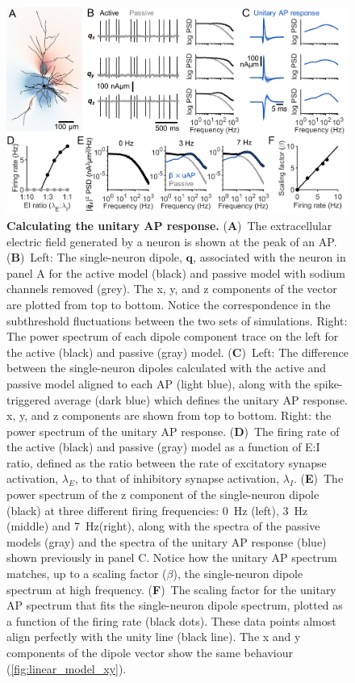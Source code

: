 \begin{figure}[t!]
	\centering
	\includegraphics[width=13.2cm]{Figures/chapter3/figure1.png}
    
    \caption[Calculating the unitary AP response]{\textbf{Calculating the unitary AP response.} (\textbf{A})~The extracellular electric field generated by a neuron is shown at the peak of an AP. (\textbf{B})~Left: The single-neuron dipole, $\bm{q}$, associated with the neuron in panel A for the active model (black) and passive model with sodium channels removed (grey). The x, y, and z components of the vector are plotted from top to bottom. Notice the correspondence in the subthreshold fluctuations between the two sets of simulations. Right: The power spectrum of each dipole component trace on the left for the active (black) and passive (gray) model. (\textbf{C})~Left: The difference between the single-neuron dipoles calculated with the active and passive model aligned to each AP (light blue), along with the spike-triggered average (dark blue) which defines the unitary AP response. x, y, and z components are shown from top to bottom. Right: the power spectrum of the unitary AP response. (\textbf{D})~The firing rate of the active (black) and passive (gray) model as a function of E:I ratio, defined as the ratio between the rate of excitatory synapse activation, $\lambda_E$, to that of inhibitory synapse activation, $\lambda_I$. (\textbf{E})~The power spectrum of the z component of the single-neuron dipole (black) at three different firing frequencies: 0~\unit{\hertz} (left), 3~\unit{\hertz} (middle) and 7~\unit{\hertz}(right), along with the spectra of the passive models (gray) and the spectra of the unitary AP response (blue) shown previously in panel C. Notice how the unitary AP spectrum matches, up to a scaling factor ($\beta$), the single-neuron dipole spectrum at high frequency. (\textbf{F})~The scaling factor for the unitary AP spectrum that fits the single-neuron dipole spectrum, plotted as a function of the firing rate (black dots). These data points almost align perfectly with the unity line (black line). The x and y components of the dipole vector show the same behaviour ({\autoref{fig:linear_model_xy}}).} 
    \label{fig:example_uAP}
\end{figure}

